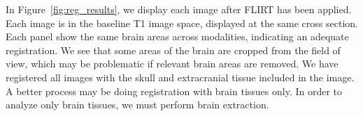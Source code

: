 In Figure~\ref{fig:reg_results}, we display each image after FLIRT has been applied.  Each image is in the baseline T1 image space, displayed at the same cross section.  Each panel show the same brain areas across modalities, indicating an adequate registration.  We see that some areas of the brain are cropped from the field of view, which may be problematic if relevant brain areas are removed.  We have registered all images with the skull and extracranial tissue included in the image.  A better process may be doing registration with brain tissues only.  In order to analyze only brain tissues, we must perform brain extraction.

\begin{figure}
   \hspace*{-0.9em}
\hfill
\hfill
\hfill
\end{figure}
